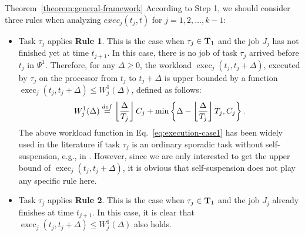\begin{appProof}{Theorem~\ref{theorem:general-framework}}
According to Step 1, we should consider three rules when analyzing $exec_j(t_j, t)$ for $j=1,2,\ldots,k-1$:
\begin{itemize}
\item Task $\tau_j$ applies {\bf Rule 1}. This is the case when
  $\tau_j \in {\bf T}_1$ and the job $J_j$ has not finished yet at
  time $t_{j+1}$. In this case, there is no job of task $\tau_j$
  arrived before $t_j$ in $\Psi^1$.  Therefore, for any $\Delta \geq
  0$, the workload $\operatorname{exec}_j(t_j, t_j+\Delta)$, executed by $\tau_j$ on the
  processor from $t_j$ to $t_j+\Delta$ is upper bounded by a function $\operatorname{exec}_j(t_j, t_j+\Delta)  \leq W_j^1(\Delta)$, defined as follows:
{\footnotesize \begin{equation}
  \label{eq:execution-case1}
  W_j^1(\Delta) \stackrel{\mbox{def}}{=} \floor{\frac{\Delta}{T_j}}C_j + \min\left\{\Delta-\floor{\frac{\Delta}{T_j}}T_j, C_j\right\}.
\end{equation}}The above workload function in Eq.~\eqref{eq:execution-case1} has been widely used in the literature if task $\tau_j$ is an ordinary sporadic task without self-suspension, e.g., in \cite{bertogna2006new}. However, since we are only interested to get the upper bound  of $\operatorname{exec}_j(t_j, t_j+\Delta)$, it is obvious that self-suspension does not play any specific rule here.

\item Task $\tau_j$ applies {\bf Rule 2}. This is the case when
  $\tau_j \in {\bf T}_1$ and the job $J_j$ already finishes at time
  $t_{j+1}$. In this case, it is clear that $\operatorname{exec}_j(t_j, t_j+\Delta)  \leq W_j^1(\Delta)$ also holds.


\end{itemize}
\end{appProof}
